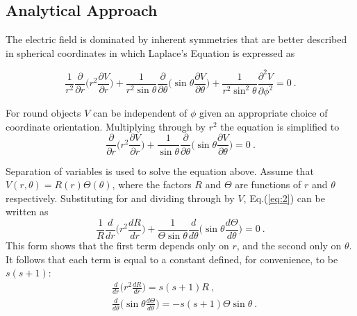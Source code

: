 \documentclass[a4paper]{jpconf}
\begin{document}
\subsection*{Analytical Approach} 

The electric field is dominated by inherent symmetries that are better described in spherical coordinates \cite{RHB-MathematicalMethods} in which Laplace's Equation is expressed as

\begin{equation}
\frac{1}{r^2}\frac{\partial}{\partial r}\bigg(r^2 \frac{\partial V}{\partial r}\bigg) + \frac{1}{r^2 \sin \theta} \frac{\partial}{\partial \theta}\bigg(\sin \theta \frac{\partial V}{\partial \theta}\bigg) + \frac{1}{r^2 \sin^2 \theta}\frac{\partial^2 V}{\partial \phi^2} = 0~.
\label{eq:1}
\end{equation}

For round objects $V$ can be independent of $\phi$ given an appropriate choice of coordinate orientation. Multiplying through by $r^2$ the equation is simplified to
\begin{equation}
\frac{\partial}{\partial r}\bigg(r^2 \frac{\partial V}{\partial r}\bigg) + \frac{1}{\sin \theta}\frac{\partial}{\partial \theta}\bigg(\sin \theta \frac{\partial V}{\partial \theta}\bigg) = 0~.
\label{eq:2}
\end{equation}

Separation of variables is used to solve the equation above. Assume that $V(r,\theta) = R(r)\Theta(\theta)$, where the factors $R$ and $\Theta$ are functions of $r$ and $\theta$ respectively. Substituting for and dividing through by $V$, Eq.(\ref{eq:2}) can be written as 
\begin{equation}
\frac{1}{R}\frac{d}{dr}\bigg(r^2 \frac{dR}{dr}\bigg) + \frac{1}{\Theta \sin \theta}\frac{d}{d \theta}\bigg(\sin \theta \frac{d \Theta }{d \theta}\bigg) = 0~.
\label{eq:3}
\end{equation}This form shows that the first term depends only on $r$, and the second only on $\theta$. It follows that  each term is equal to a constant defined, for convenience, to be $s(s+1)$:
\begin{subequations}
\begin{align}
&\frac{d}{dr}\bigg(r^2 \frac{dR}{dr}\bigg) = s (s+1) R~, \label{eq:4.1}\\ 
&\frac{d}{d \theta}\bigg(\sin \theta \frac{d \Theta}{d \theta}\bigg) = - s (s+1) \Theta \sin \theta~. \label{eq:4.2}
\end{align}
\label{eq:4}
\end{subequations} 
\end{document}
